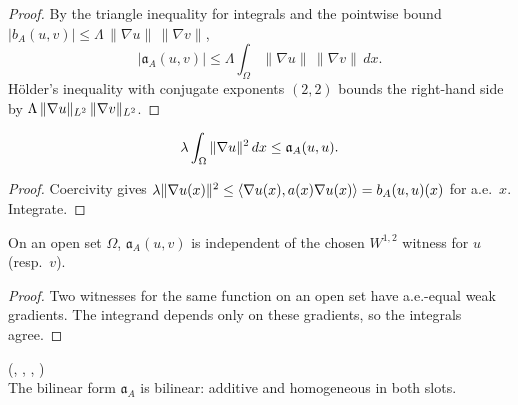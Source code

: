 \begin{proof}
\leanok
{}

By the triangle inequality for integrals and the pointwise bound $|b_A(u,v)| \leq \Lambda\,\|\nabla u\|\,\|\nabla v\|$,
\begin{equation*}
  |\mathfrak{a}_A(u,v)| \leq \Lambda \int_{\Omega} \|\nabla u\|\,\|\nabla v\|\,dx.
\end{equation*}
H\"older's inequality with conjugate exponents $(2,2)$ bounds the right-hand side by $\Lambda \,\|\nabla u\|_{L^{2}}\,\|\nabla v\|_{L^{2}}$.
\end{proof}

\begin{lemma}
\label{lem:bilinForm_coercive}
\leanok
{}
\begin{equation*}
  \lambda \int_{\Omega} \|\nabla u\|^{2}\,dx \leq \mathfrak{a}_A(u,u).
\end{equation*}
\end{lemma}

\begin{proof}
\leanok
{}

Coercivity gives $\lambda\|\nabla u(x)\|^{2} \leq \langle \nabla u(x), a(x)\nabla u(x)\rangle = b_A(u,u)(x)$ for a.e.\ $x$. Integrate.
\end{proof}

\begin{lemma}
\label{lem:bilinFormOfCoeff_eq_left}
\leanok
{}
On an open set $\Omega$, $\mathfrak{a}_A(u,v)$ is independent of the chosen $W^{1,2}$ witness for $u$ (resp.\ $v$).
\end{lemma}

\begin{proof}
\leanok
{}

Two witnesses for the same function on an open set have a.e.-equal weak gradients. The integrand depends only on these gradients, so the integrals agree.
\end{proof}

\begin{lemma}
\label{lem:bilinFormOfCoeff_add_left}
\leanok
{}
(,
,
,
)\\
The bilinear form $\mathfrak{a}_A$ is bilinear: additive and homogeneous in both slots.
\end{lemma}

